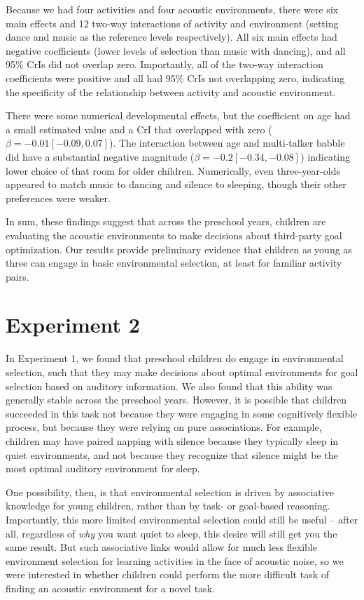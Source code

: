 \documentclass[10pt, letterpaper]{article}
\begin{document}
Because we had four activities and four acoustic environments, there
were six main effects and 12 two-way interactions of activity and
environment (setting dance and music as the reference levels
respectively). All six main effects had negative coefficients (lower
levels of selection than music with dancing), and all 95\% CrIs did not
overlap zero. Importantly, all of the two-way interaction coefficients
were positive and all had 95\% CrIs not overlapping zero, indicating the
specificity of the relationship between activity and acoustic
environment.

There were some numerical developmental effects, but the coefficient on
age had a small estimated value and a CrI that overlapped with zero
(\(\beta = -0.01 [-0.09, 0.07]\)). The interaction between age and
multi-talker babble did have a substantial negative magnitude
(\(\beta = -0.2 [-0.34,-0.08]\)) indicating lower choice of that room
for older children. Numerically, even three-year-olds appeared to match
music to dancing and silence to sleeping, though their other preferences
were weaker.

In sum, these findings suggest that across the preschool years, children
are evaluating the acoustic environments to make decisions about
third-party goal optimization. Our results provide preliminary evidence
that children as young as three can engage in basic environmental
selection, at least for familiar activity pairs.

\hypertarget{experiment-2}{%
\section{Experiment 2}\label{experiment-2}}

In Experiment 1, we found that preschool children do engage in
environmental selection, such that they may make decisions about optimal
environments for goal selection based on auditory information. We also
found that this ability was generally stable across the preschool years.
However, it is possible that children succeeded in this task not because
they were engaging in some cognitively flexible process, but because
they were relying on pure associations. For example, children may have
paired napping with silence because they typically sleep in quiet
environments, and not because they recognize that silence might be the
most optimal auditory environment for sleep.

One possibility, then, is that environmental selection is driven by
associative knowledge for young children, rather than by task- or
goal-based reasoning. Importantly, this more limited environmental
selection could still be useful -- after all, regardless of \emph{why}
you want quiet to sleep, this desire will still get you the same result.
But such associative links would allow for much less flexible
environment selection for learning activities in the face of acoustic
noise, so we were interested in whether children could perform the more
difficult task of finding an acoustic environment for a novel task.
\end{document}
